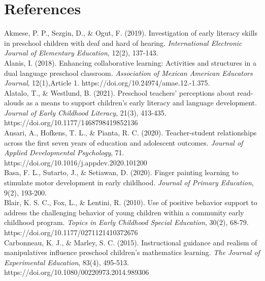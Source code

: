 \documentclass[11.5pt]{sig-alternate}
\begin{document}
\section*{References}\par 

\leftskip 0.25in
\parindent -0.25in 

Akmese, P. P., Sezgin, D., \& Ogut, F. (2019). Investigation of early literacy skills in preschool 
children with deaf and hard of hearing. \textit{International Electronic Journal of Elementary Education}, 12(2), 137-143. 
\\

Alanis, I. (2018). Enhancing collaborative learning: Activities and structures in a dual language 
preschool classroom. \textit{Association of Mexican American Educators Journal}, 12(1),Article 1. https://doi.org/10.24974/amae.12.-1.375. 
\\

Alatalo, T., \& Westlund, B. (2021). Preschool teachers’ perceptions about read-alouds as a 
means to support children’s early literacy and language development. \textit{Journal of Early Childhood Literacy}, 21(3), 413-435.\\ https://doi.org/10.1177/1468798419852136 
\\

Ansari, A., Hofkens, T. L., \& Pianta, R. C. (2020). Teacher-student relationships across the first 
seven years of education and adolescent outcomes. \textit{Journal of Applied Developmental Psychology}, 71. \\https://doi.org/10.1016/j.appdev.2020.101200 
\\

Basa, F. L., Sutarto, J., \& Setiawan, D. (2020). Finger painting learning to stimulate motor 
development in early childhood. \textit{Journal of Primary Education}, 9(2), 193-200.
\\

Blair, K. S. C., Fox, L., \& Lentini, R. (2010). Use of positive behavior support to address the 
challenging behavior of young children within a community early childhood program. \textit{Topics in Early Childhood Special Education}, 30(2), 68-79. 
https://doi.org/10.1177/0271121410372676 
\\

Carbonneau, K. J., \& Marley, S. C. (2015). Instructional guidance and realism of manipulatives 
influence preschool children’s mathematics learning. \textit{The Journal of Experimental Education}, 83(4), 495-513. \\ https://doi.org/10.1080/00220973.2014.989306 
\\
\end{document}
